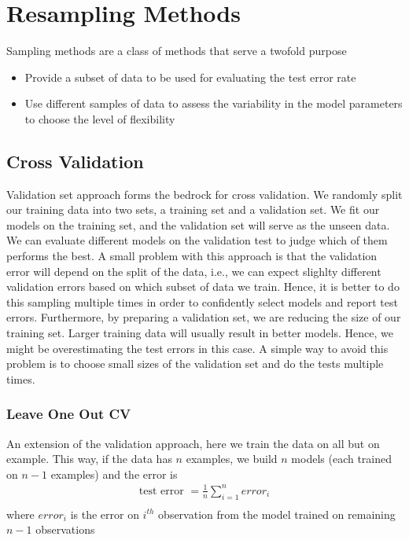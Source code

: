 \documentclass[../statistical_learning_notes.tex]{subfiles}
\begin{document}
    \chapter{Resampling Methods}
    Sampling methods are a class of methods that serve a twofold purpose
    \begin{itemize}
        \item Provide a subset of data to be used for evaluating the test error rate
        \item Use different samples of data to assess the variability in the model parameters to choose the level of flexibility
    \end{itemize}


    \section{Cross Validation}
    Validation set approach forms the bedrock for cross validation. We randomly split our training data into two sets, a training set and a validation set. We fit our models on the training set, and the validation set will serve as the unseen data. We can evaluate different models on the validation test to judge which of them performs the best.\newline
    A small problem with this approach is that the validation error will depend on the split of the data, i.e., we can expect slighlty different validation errors based on which subset of data we train. Hence, it is better to do this sampling multiple times in order to confidently select models and report test errors. \newline
    Furthermore, by preparing a validation set, we are reducing the size of our training set. Larger training data will usually result in better models. Hence, we might be overestimating the test errors in this case. A simple way to avoid this problem is to choose small sizes of the validation set and do the tests multiple times.

    \subsection{Leave One Out CV}
    An extension of the validation approach, here we train the data on all but on example. This way, if the data has $n$ examples, we build $n$ models (each trained on $n-1$ examples) and the error is
    \begin{align*}
        \text{test error } = \frac{1}{n}\sum_{i=1}^{n} error_{i}\\
    \end{align*}
    where $error_{i}$ is the error on $i^{th}$ observation from the model trained on remaining $n-1$ observations\newline
\end{document}
